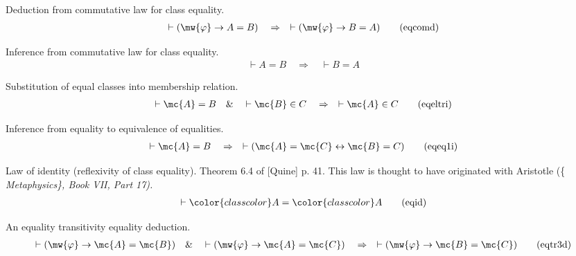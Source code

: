 \begin{lemma} {Deduction from commutative law for class
equality.}
\begin{align}
\vdash ( \mw{\varphi} \rightarrow A = B )\quad\Rightarrow\quad \vdash (
    \mw{\varphi} \rightarrow B = A )\label{eq:eqcomd}\tag{eqcomd}
\end{align}
\end{lemma}


\begin{lemma} {Inference from commutative law for class
equality.}
\begin{align}
\vdash A = B\quad\Rightarrow\quad \vdash B = A\label{eq:eqcomi}\tag{eqcomi}
\end{align}
\end{lemma}


\begin{lemma} {Substitution of equal classes into
membership relation.} %
\begin{align}
\vdash \mc{A} = B\quad\&\quad \vdash \mc{B} \in C\quad\Rightarrow\quad \vdash \mc{A} \in
    C\label{eq:eqeltri}\tag{eqeltri}
\end{align}
\end{lemma}


\begin{lemma} {Inference from equality to equivalence of
equalities.}  
\begin{align}
\vdash \mc{A} = B\quad\Rightarrow\quad \vdash ( \mc{A} = \mc{C} \leftrightarrow \mc{B} = C
    )\label{eq:eqeq1i}\tag{eqeq1i}
\end{align}
\end{lemma}


\begin{lemma} {Law of identity} (reflexivity of class equality).
Theorem 6.4 of [Quine]
       p. 41.
       This law is thought to have originated with Aristotle (\{\em
Metaphysics\},
       Book VII, Part 17).  
\begin{align}
\vdash {\color{classcolor}A} = {\color{classcolor}A}\label{eq:eqid}\tag{eqid}
\end{align}
\end{lemma}


\begin{lemma} {An equality transitivity equality deduction.}
\begin{align}
\vdash ( \mw{\varphi} \rightarrow \mc{A} = \mc{B} )\quad\&\quad \vdash ( \mw{\varphi}
    \rightarrow \mc{A} = \mc{C} )\quad\Rightarrow\quad \vdash ( \mw{\varphi} \rightarrow
    \mc{B} = \mc{C} )\label{eq:eqtr3d}\tag{eqtr3d}
\end{align}
\end{lemma}


